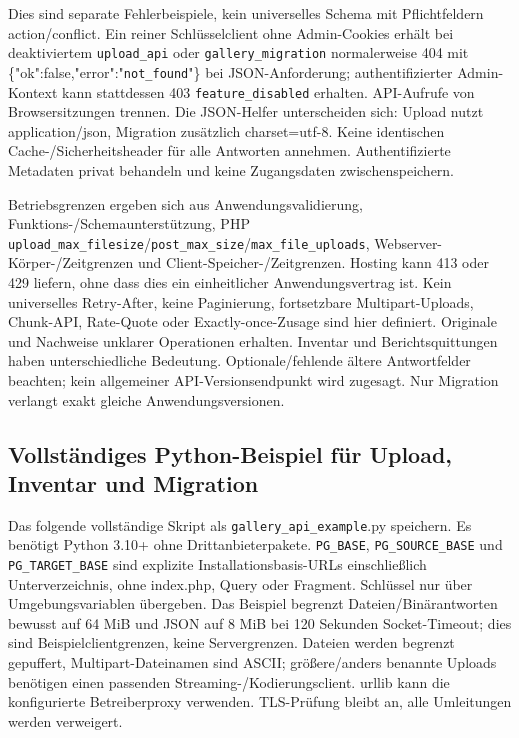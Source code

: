 \documentclass[11pt,a4paper]{article}
\newcommand{\codeword}[1]{\nolinkurl{#1}}
\begin{document}
Dies sind separate Fehlerbeispiele, kein universelles Schema mit Pflichtfeldern
action/conflict. Ein reiner Schlüsselclient ohne Admin-Cookies erhält bei deaktiviertem
\codeword{upload_api} oder \codeword{gallery_migration} normalerweise 404 mit
\{"ok":false,"error":"\codeword{not_found}"\} bei JSON-Anforderung; authentifizierter
Admin-Kontext kann stattdessen 403 \codeword{feature_disabled} erhalten. API-Aufrufe von
Browsersitzungen trennen. Die JSON-Helfer unterscheiden sich: Upload nutzt application/json,
Migration zusätzlich charset=utf-8. Keine identischen Cache-/Sicherheitsheader für alle
Antworten annehmen. Authentifizierte Metadaten privat behandeln und keine Zugangsdaten
zwischenspeichern.

Betriebsgrenzen ergeben sich aus Anwendungsvalidierung, Funktions-/Schemaunterstützung, PHP
\codeword{upload_max_filesize}/\codeword{post_max_size}/\codeword{max_file_uploads},
Webserver-Körper-/Zeitgrenzen und Client-Speicher-/Zeitgrenzen. Hosting kann 413 oder 429
liefern, ohne dass dies ein einheitlicher Anwendungsvertrag ist. Kein universelles
Retry-After, keine Paginierung, fortsetzbare Multipart-Uploads, Chunk-API, Rate-Quote oder
Exactly-once-Zusage sind hier definiert. Originale und Nachweise unklarer Operationen
erhalten. Inventar und Berichtsquittungen haben unterschiedliche Bedeutung.
Optionale/fehlende ältere Antwortfelder beachten; kein allgemeiner API-Versionsendpunkt wird
zugesagt. Nur Migration verlangt exakt gleiche Anwendungsversionen.

\subsection{\texorpdfstring{Vollständiges Python-Beispiel für Upload, Inventar und Migration}{Vollständiges Python-Beispiel für Upload, Inventar und Migration}}

\label{api352:complete-client}

Das folgende vollständige Skript als \codeword{gallery_api_example}.py speichern. Es
benötigt Python 3.10+ ohne Drittanbieterpakete. \codeword{PG_BASE},
\codeword{PG_SOURCE_BASE} und \codeword{PG_TARGET_BASE} sind explizite
Installationsbasis-URLs einschließlich Unterverzeichnis, ohne index.php, Query oder
Fragment. Schlüssel nur über Umgebungsvariablen übergeben. Das Beispiel begrenzt
Dateien/Binärantworten bewusst auf 64 MiB und JSON auf 8 MiB bei 120 Sekunden
Socket-Timeout; dies sind Beispielclientgrenzen, keine Servergrenzen. Dateien werden
begrenzt gepuffert, Multipart-Dateinamen sind ASCII; größere/anders benannte Uploads
benötigen einen passenden Streaming-/Kodierungsclient. urllib kann die konfigurierte
Betreiberproxy verwenden. TLS-Prüfung bleibt an, alle Umleitungen werden verweigert.
\end{document}
